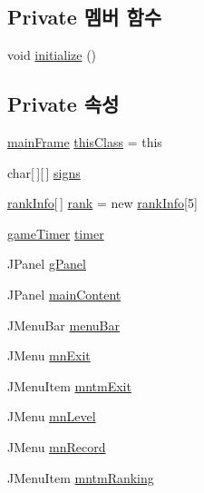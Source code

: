 \subsection*{Private 멤버 함수}
\begin{DoxyCompactItemize}
\item 
void \hyperlink{classpkg_1_1main_frame_af97296a25c6856f7a7078d0418773229}{initialize} ()
\end{DoxyCompactItemize}
\subsection*{Private 속성}
\begin{DoxyCompactItemize}
\item 
\hyperlink{classpkg_1_1main_frame}{main\+Frame} \hyperlink{classpkg_1_1main_frame_aa7857342de44fb7ddfa5d6e2685f71fb}{this\+Class} = this
\item 
char\mbox{[}$\,$\mbox{]}\mbox{[}$\,$\mbox{]} \hyperlink{classpkg_1_1main_frame_ae3c9f6e7ee48c1661dc3fe814fd67554}{signs}
\item 
\hyperlink{classpkg_1_1rank_info}{rank\+Info}\mbox{[}$\,$\mbox{]} \hyperlink{classpkg_1_1main_frame_a4a021c36a28ece6900f13d2254e13a96}{rank} = new \hyperlink{classpkg_1_1rank_info}{rank\+Info}\mbox{[}5\mbox{]}
\item 
\hyperlink{classpkg_1_1game_timer}{game\+Timer} \hyperlink{classpkg_1_1main_frame_aa204a940456c1c064259cafdd59434a6}{timer}
\item 
J\+Panel \hyperlink{classpkg_1_1main_frame_a17ea45ba089445a24b9da9bf561f6603}{g\+Panel}
\item 
J\+Panel \hyperlink{classpkg_1_1main_frame_ac52666e4454808a34bc19f554aba065b}{main\+Content}
\item 
J\+Menu\+Bar \hyperlink{classpkg_1_1main_frame_a83694a00c25375434549ffd58d10ad77}{menu\+Bar}
\item 
J\+Menu \hyperlink{classpkg_1_1main_frame_ae8893bf8bbe88ef0095ae7aa423e2b23}{mn\+Exit}
\item 
J\+Menu\+Item \hyperlink{classpkg_1_1main_frame_ab5c36db42de946a49e1955e4e6bdfd6b}{mntm\+Exit}
\item 
J\+Menu \hyperlink{classpkg_1_1main_frame_adceefa443b0c2344aa1ad15f8da92dac}{mn\+Level}
\item 
J\+Menu \hyperlink{classpkg_1_1main_frame_adf7d30ed5ce4e5567e4228efaf962161}{mn\+Record}
\item 
J\+Menu\+Item \hyperlink{classpkg_1_1main_frame_a998c4b1062e1b23bc0cbfe05a12fa138}{mntm\+Ranking}

\end{DoxyCompactItemize}
